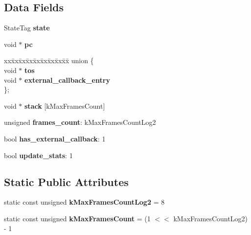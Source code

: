 \subsection*{Data Fields}
\begin{DoxyCompactItemize}
\item 
\mbox{\label{structv8_1_1TickSample_a6ca7bd9445806b92b938eab2e700c324}} 
State\+Tag {\bfseries state}
\item 
\mbox{\label{structv8_1_1TickSample_a33cfc3082f836ce04dfcb97a3691f599}} 
void $\ast$ {\bfseries pc}
\item 
\mbox{\label{structv8_1_1TickSample_ae6c0db3c542c58b92e6da4438364c393}} 
\begin{tabbing}
xx\=xx\=xx\=xx\=xx\=xx\=xx\=xx\=xx\=\kill
union \{\\
\>void $\ast$ {\bfseries tos}\\
\>void $\ast$ {\bfseries external\_callback\_entry}\\
\}; \\

\end{tabbing}\item 
\mbox{\label{structv8_1_1TickSample_ae85c9bd6ff1da565d7e3066615a4d450}} 
void $\ast$ {\bfseries stack} \mbox{[}k\+Max\+Frames\+Count\mbox{]}
\item 
\mbox{\label{structv8_1_1TickSample_a00bfe6e03f75c291e220777fe74272d5}} 
unsigned {\bfseries frames\+\_\+count}\+: k\+Max\+Frames\+Count\+Log2
\item 
\mbox{\label{structv8_1_1TickSample_aa7c90f53d4ac6ab23727e21369f70b6e}} 
bool {\bfseries has\+\_\+external\+\_\+callback}\+: 1
\item 
\mbox{\label{structv8_1_1TickSample_aece17f054264917dcf20fd9ef0616930}} 
bool {\bfseries update\+\_\+stats}\+: 1
\end{DoxyCompactItemize}
\subsection*{Static Public Attributes}
\begin{DoxyCompactItemize}
\item 
\mbox{\label{structv8_1_1TickSample_a74b64cf598134b781b4ae1c65c31a70a}} 
static const unsigned {\bfseries k\+Max\+Frames\+Count\+Log2} = 8
\item 
\mbox{\label{structv8_1_1TickSample_a7f1b6ed32cd88d137e70d99adaa37d64}} 
static const unsigned {\bfseries k\+Max\+Frames\+Count} = (1 $<$$<$ k\+Max\+Frames\+Count\+Log2) -\/ 1
\end{DoxyCompactItemize}


